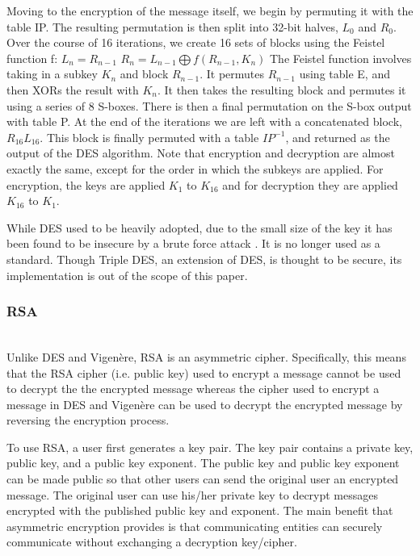 \documentclass[acmlarge]{acmart}
\begin{document}
Moving to the encryption of the message itself, we begin by permuting it with the table IP. The resulting permutation is then split into 32-bit halves, $L_{0}$ and $R_{0}$. Over the course of 16 iterations, we create 16  sets of blocks using the Feistel function f:
$L_{n} = R_{n-1}$
$R_{n} = L_{n-1} \bigoplus f(R_{n-1}, K_{n})$ 
	The Feistel function involves taking in a subkey $K_{n}$ and block $R_{n - 1}$. It permutes $R_{n - 1}$ using table E, and then XORs the result with $K_{n}$. It then takes the resulting block and permutes it using a series of 8 S-boxes. There is then a final permutation on the S-box output with table P. At the end of the iterations we are left with a concatenated block, $R_{16}L_{16}$. This block is finally permuted with a table $IP^{-1}$, and returned as the output of the DES algorithm. Note that encryption and decryption are almost exactly the same, except for the order in which the subkeys are applied. For encryption, the keys are applied $K_{1}$ to $K_{16}$ and for decryption they are applied $K_{16}$ to $K_{1}$.

While DES used to be heavily adopted, due to the small size of the key it has been found to be insecure by a brute force attack \cite{DESCryptanalysis}. It is no longer used as a standard. Though Triple DES, an extension of DES, is thought to be secure, its implementation is out of the scope of this paper. 

\subsubsection{RSA}
\hspace*{\fill} \\ %
Unlike DES and Vigen\`{e}re, RSA is an asymmetric cipher. Specifically, this means that the RSA cipher (i.e. public key) used to encrypt a message cannot be used to decrypt the the encrypted message whereas the cipher used to encrypt a message in DES and Vigen\`{e}re can be used to decrypt the encrypted message by reversing the encryption process.
		
To use RSA, a user first generates a key pair. The key pair contains a private key, public key, and a public key exponent. The public key and public key exponent can be made public so that other users can send the original user an encrypted message. The original user can use his/her private key to decrypt messages encrypted with the published public key and exponent. The main benefit that asymmetric encryption provides is that communicating entities can securely communicate without exchanging a decryption key/cipher.
\end{document}
